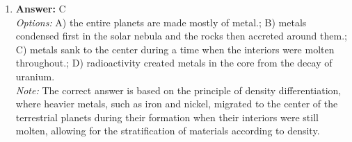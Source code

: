 \documentclass[12pt]{article}
\begin{document}
\begin{enumerate}[label=\arabic*.]
\\ \textit{Note:} The equatorial wind speed of more than 900 miles per hour is not a similarity between Saturn and Jupiter's atmospheres because while Jupiter is known for its high wind speeds, Saturn's equatorial winds are significantly slower, often averaging around 1,100 kilometers per hour (about 680 miles per hour).
\item \textbf{Answer:} C
\\ \textit{Options:} A) the entire planets are made mostly of metal.; B) metals condensed first in the solar nebula and the rocks then accreted around them.; C) metals sank to the center during a time when the interiors were molten throughout.; D) radioactivity created metals in the core from the decay of uranium.
\\ \textit{Note:} The correct answer is based on the principle of density differentiation, where heavier metals, such as iron and nickel, migrated to the center of the terrestrial planets during their formation when their interiors were still molten, allowing for the stratification of materials according to density.
\end{enumerate}
\end{document}
